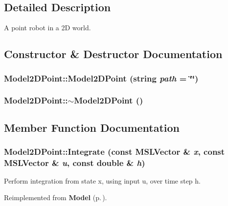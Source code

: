 \subsection{Detailed Description}
A point robot in a 2D world.



\subsection{Constructor \& Destructor Documentation}
\subsubsection{\setlength{\rightskip}{0pt plus 5cm}Model2DPoint::Model2DPoint (string {\em path} = \char`\"{}\char`\"{})}\label{classModel2DPoint_a0}


\subsubsection{\setlength{\rightskip}{0pt plus 5cm}Model2DPoint::$\sim$Model2DPoint ()\hspace{0.3cm}{\tt  [inline, virtual]}}\label{classModel2DPoint_a1}




\subsection{Member Function Documentation}
\subsubsection{ Model2DPoint::Integrate (const {\bf MSLVector} \& {\em x}, const {\bf MSLVector} \& {\em u}, const double \& {\em h})\hspace{0.3cm}{\tt  [virtual]}}\label{classModel2DPoint_a2}


Perform integration from state x, using input u, over time step h.



Reimplemented from {\bf Model} {\rm (p.\,\pageref{classModel_a5})}.

